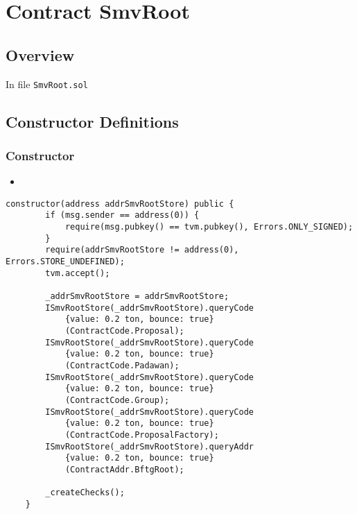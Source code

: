
\chapter{Contract SmvRoot}

\minitoc

\section{Overview}


In file {\tt SmvRoot.sol}

\section{Constructor Definitions}


\subsection{Constructor}

\begin{itemize}
\item {}
\end{itemize}

\begin{lstlisting}[firstnumber=64]
    constructor(address addrSmvRootStore) public {
        if (msg.sender == address(0)) {
            require(msg.pubkey() == tvm.pubkey(), Errors.ONLY_SIGNED);
        }
        require(addrSmvRootStore != address(0), Errors.STORE_UNDEFINED);
        tvm.accept();
        
        _addrSmvRootStore = addrSmvRootStore;
        ISmvRootStore(_addrSmvRootStore).queryCode
            {value: 0.2 ton, bounce: true}
            (ContractCode.Proposal);
        ISmvRootStore(_addrSmvRootStore).queryCode
            {value: 0.2 ton, bounce: true}
            (ContractCode.Padawan);
        ISmvRootStore(_addrSmvRootStore).queryCode
            {value: 0.2 ton, bounce: true}
            (ContractCode.Group);
        ISmvRootStore(_addrSmvRootStore).queryCode
            {value: 0.2 ton, bounce: true}
            (ContractCode.ProposalFactory);
        ISmvRootStore(_addrSmvRootStore).queryAddr
            {value: 0.2 ton, bounce: true}
            (ContractAddr.BftgRoot);

        _createChecks();
    }
\end{lstlisting}

